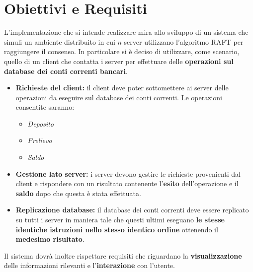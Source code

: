 \section{Obiettivi e Requisiti}
	L'implementazione che si intende realizzare mira allo sviluppo di un sistema che simuli un ambiente distribuito in cui $n$ server utilizzano l'algoritmo RAFT per raggiungere il consenso. In particolare si è deciso di utilizzare, come scenario, quello di un client che contatta i server per effettuare delle \textbf{ operazioni sul database dei conti correnti bancari}.
	\begin{itemize}
			\item \textbf{Richieste del client:} il client deve poter sottomettere ai server delle operazioni da eseguire sul database dei conti correnti. Le operazioni consentite saranno:
				\begin{itemize}
					\item \emph{Deposito}
					\item \emph{Prelievo}
					\item \emph{Saldo}
				\end{itemize}
			\item \textbf{Gestione lato server:} i server devono gestire le richieste provenienti dal client e rispondere con un risultato contenente l'\textbf{esito} dell'operazione e il \textbf{saldo} dopo che questa è stata effettuata.
			\item \textbf{Replicazione database:} il database dei conti correnti deve essere replicato su tutti i server in maniera tale che questi ultimi eseguano \textbf{le stesse identiche istruzioni nello stesso identico ordine} ottenendo il \textbf{medesimo risultato}.
		\end{itemize}

	Il sistema dovrà inoltre rispettare requisiti che riguardano la \textbf{visualizzazione} delle informazioni rilevanti e l'\textbf{interazione} con l'utente.


